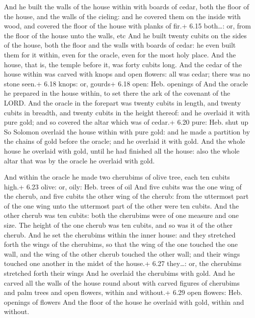  And he built the walls of the house within with boards of
cedar, both the floor of the house, and the walls of the cieling: and he
covered them on the inside with wood, and covered the floor of the house
with planks of fir.+ 6.15 both\ldots: or, from the floor of the house
unto the walls, etc  And he built twenty cubits on the
sides of the house, both the floor and the walls with boards of cedar:
he even built them for it within, even for the oracle, even for the most
holy place.  And the house, that is, the temple before it,
was forty cubits long.  And the cedar of the house within
was carved with knops and open flowers: all was cedar; there was no
stone seen.+ 6.18 knops: or, gourds+ 6.18 open: Heb. openings of
 And the oracle he prepared in the house within, to set
there the ark of the covenant of the LORD.  And the oracle
in the forepart was twenty cubits in length, and twenty cubits in
breadth, and twenty cubits in the height thereof: and he overlaid it
with pure gold; and so covered the altar which was of cedar.+ 6.20 pure:
Heb. shut up  So Solomon overlaid the house within with
pure gold: and he made a partition by the chains of gold before the
oracle; and he overlaid it with gold.  And the whole house
he overlaid with gold, until he had finished all the house: also the
whole altar that was by the oracle he overlaid with gold.

 And within the oracle he made two cherubims of olive
tree, each ten cubits high.+ 6.23 olive: or, oily: Heb. trees of oil
 And five cubits was the one wing of the cherub, and five
cubits the other wing of the cherub: from the uttermost part of the one
wing unto the uttermost part of the other were ten cubits. 
And the other cherub was ten cubits: both the cherubims were of one
measure and one size.  The height of the one cherub was ten
cubits, and so was it of the other cherub.  And he set the
cherubims within the inner house: and they stretched forth the wings of
the cherubims, so that the wing of the one touched the one wall, and the
wing of the other cherub touched the other wall; and their wings touched
one another in the midst of the house.+ 6.27 they\ldots: or, the
cherubims stretched forth their wings  And he overlaid the
cherubims with gold.  And he carved all the walls of the
house round about with carved figures of cherubims and palm trees and
open flowers, within and without.+ 6.29 open flowers: Heb. openings of
flowers  And the floor of the house he overlaid with gold,
within and without.


